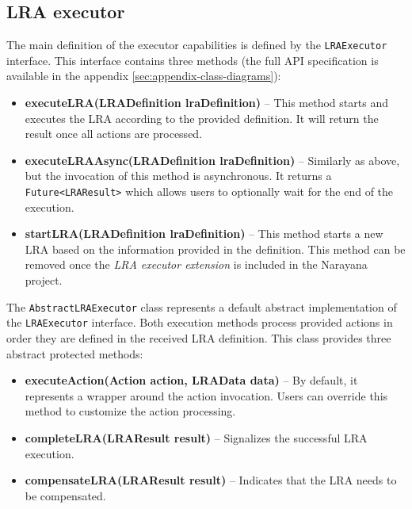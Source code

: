 \documentclass[oneside,
  digital, %
  table,   %
  nolof,     %
  nolot,     %
]{fithesis3}
\begin{document}
\subsection{LRA executor}

The main definition of the executor capabilities is defined by the \texttt{LRAExecutor} interface. This interface contains three methods (the full API specification is available in the appendix \ref{sec:appendix-class-diagrams}):

\begin{itemize}
    \item \textbf{executeLRA(LRADefinition lraDefinition)} -- This method starts and executes the LRA according to the provided definition. It will return the result once all actions are processed.
    
    \item \textbf{executeLRAAsync(LRADefinition lraDefinition)} -- Similarly as above, but the invocation of this method is asynchronous. It returns a \texttt{Future<LRAResult>} which allows users to optionally wait for the end of the execution.
    
    \item \textbf{startLRA(LRADefinition lraDefinition)} -- This method starts a new LRA based on the information provided in the definition. This method can be removed once the \textit{LRA executor extension} is included in the Narayana project.
\end{itemize}

The \texttt{AbstractLRAExecutor} class represents a default abstract implementation of the \texttt{LRAExecutor} interface. Both execution methods process provided actions in order they are defined in the received LRA definition. This class provides three abstract protected methods:

\begin{itemize}
    \item \textbf{executeAction(Action action, LRAData data)} -- By default, it represents a wrapper around the action invocation. Users can override this method to customize the action processing.
    
    \item \textbf{completeLRA(LRAResult result)} -- Signalizes the successful LRA execution.
    
    \item \textbf{compensateLRA(LRAResult result)} -- Indicates that the LRA needs to be compensated.
\end{itemize}
\end{document}
